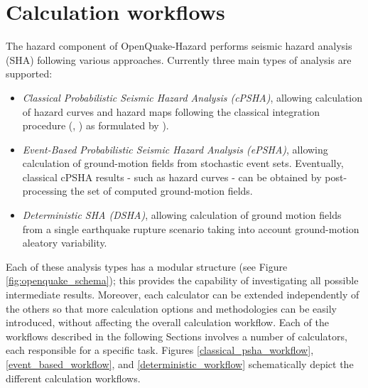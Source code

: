 \section{Calculation workflows}
The hazard component of OpenQuake-Hazard performs seismic hazard 
analysis (SHA) following various approaches. 
%
Currently three main types of analysis are supported:
\begin{itemize}
\item \textit{Classical Probabilistic Seismic Hazard Analysis (cPSHA)}, 
allowing calculation of hazard curves and hazard maps following the 
classical integration procedure 
(\cite{cornell1968}, \citet{mcguire1976}) as formulated by \cite{field2003}).
\item \textit{Event-Based Probabilistic Seismic Hazard Analysis (ePSHA)}, 
allowing calculation of ground-motion fields from stochastic event sets. 
Eventually, classical cPSHA results - such as hazard curves - can be 
obtained by post-processing the set of computed ground-motion fields.
\item \textit{Deterministic SHA (DSHA)}, allowing calculation of ground 
motion fields from a single earthquake rupture scenario taking into account 
ground-motion aleatory variability.
\end{itemize}
Each of these analysis types has a modular structure (see Figure 
\ref{fig:openquake_schema}); this provides the capability of investigating 
all possible intermediate results. Moreover, each calculator can be 
extended independently of the others so that more calculation 
options and methodologies can be easily introduced, without affecting the 
overall calculation workflow. 
Each of the workflows described in the following Sections involves a number 
of calculators, each responsible for a specific task. 
Figures \ref{classical_psha_workflow}, \ref{event_based_workflow}, and 
\ref{deterministic_workflow} schematically depict the different calculation 
workflows.
%
